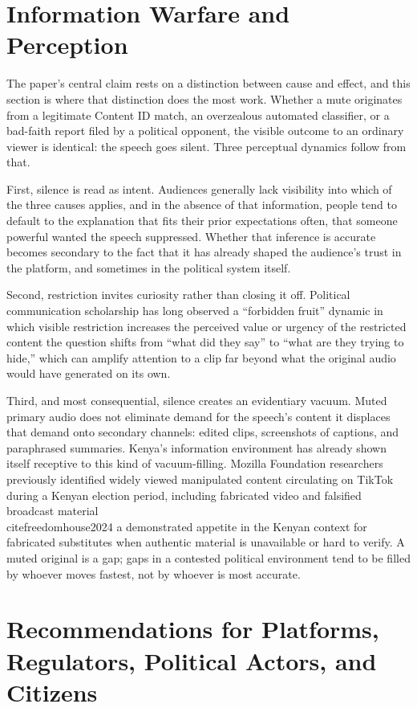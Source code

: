 \documentclass{article}
\begin{document}
\section{Information Warfare and Perception}
The paper’s central claim rests on a distinction between cause and effect, and this section is where that distinction does the most work. Whether a mute originates from a legitimate Content ID match, an overzealous automated classifier, or a bad-faith report filed by a political opponent, the visible outcome to an ordinary viewer is identical: the speech goes silent. Three perceptual dynamics follow from that.
\par 
First, silence is read as intent. Audiences generally lack visibility into which of the three causes applies, and in the absence of that information, people tend to default to the explanation that fits their prior expectations often, that someone powerful wanted the speech suppressed. Whether that inference is accurate becomes secondary to the fact that it has already shaped the audience’s trust in the platform, and sometimes in the political system itself.
\par 
Second, restriction invites curiosity rather than closing it off. Political communication scholarship has long observed a “forbidden fruit” dynamic in which visible restriction increases the perceived value or urgency of the restricted content the question shifts from “what did they say” to “what are they trying to hide,” which can amplify attention to a clip far beyond what the original audio would have generated on its own.
\par
Third, and most consequential, silence creates an evidentiary vacuum. Muted primary audio does not eliminate demand for the speech’s content it displaces that demand onto secondary channels: edited clips, screenshots of captions, and paraphrased summaries. Kenya’s information environment has already shown itself receptive to this kind of vacuum-filling. Mozilla Foundation researchers previously identified widely viewed manipulated content circulating on TikTok during a Kenyan election period, including fabricated video and falsified broadcast material \\cite{freedomhouse2024} a demonstrated appetite in the Kenyan context for fabricated substitutes when authentic material is unavailable or hard to verify. A muted original is a gap; gaps in a contested political environment tend to be filled by whoever moves fastest, not by whoever is most accurate.
\section{Recommendations for Platforms, Regulators, Political Actors, and Citizens}
\end{document}
